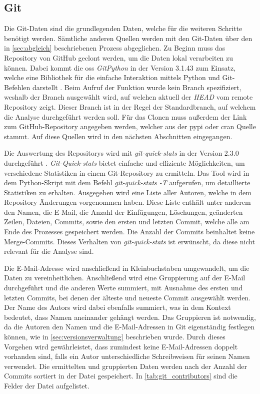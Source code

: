 \subsection{Git}
\label{subsec:datenbeschaffung_git}
Die Git-Daten sind die grundlegenden Daten, welche für die weiteren Schritte benötigt werden.
Sämtliche anderen Quellen werden mit den Git-Daten über den in \autoref{sec:abgleich} beschriebenen Prozess abgeglichen.
Zu Beginn muss das Repository von GitHub geclont werden, um die Daten lokal verarbeiten zu können.
Dabei kommt die \gls{oss} \emph{GitPython} in der Version 3.1.43 zum Einsatz, welche eine Bibliothek für die einfache Interaktion mittels Python und Git-Befehlen darstellt \autocite{thiel_gitpython-developersgitpython_2024}.
Beim Aufruf der Funktion wurde kein Branch spezifiziert, weshalb der Branch ausgewählt wird, auf welchen aktuell der \emph{HEAD} vom remote Repository zeigt.
Dieser Branch ist in der Regel der Standardbranch, auf welchem die Analyse durchgeführt werden soll.
Für das Clonen muss außerdem der Link zum GitHub-Repository angegeben werden, welcher aus der \gls{pypi} oder \gls{cran} Quelle stammt.
Auf diese Quellen wird in den nächsten Abschnitten eingegangen.

Die Auswertung des Repositorys wird mit \emph{git-quick-stats} in der Version 2.3.0 durchgeführt \autocite{arzzen_git-quick-statsgit-quick-stats_2021}.
\emph{Git-Quick-stats} bietet einfache und effiziente Möglichkeiten, um verschiedene Statistiken in einem Git-Repository zu ermitteln.
Das Tool wird in dem Python-Skript mit dem Befehl \emph{git-quick-stats -T} aufgerufen, um detaillierte Statistiken zu erhalten.
Ausgegeben wird eine Liste aller Autoren, welche in dem Repository Änderungen vorgenommen haben.
Diese Liste enthält unter anderem den Namen, die E-Mail, die Anzahl der Einfügungen, Löschungen, geänderten Zeilen, Dateien, Commits, sowie den ersten und letzten Commit, welche alle am Ende des Prozesses gespeichert werden.
Die Anzahl der Commits beinhaltet keine Merge-Commits.
Dieses Verhalten von \emph{git-quick-stats} ist erwünscht, da diese nicht relevant für die Analyse sind.

Die E-Mail-Adresse wird anschließend in Kleinbuchstaben umgewandelt, um die Daten zu vereinheitlichen.
Anschließend wird eine Gruppierung auf der E-Mail durchgeführt und die anderen Werte summiert, mit Ausnahme des ersten und letzten Commits, bei denen der älteste und neueste Commit ausgewählt werden.
Der Name des Autors wird dabei ebenfalls summiert, was in dem Kontext bedeutet, dass Namen aneinander gehängt werden.
Das Gruppieren ist notwendig, da die Autoren den Namen und die E-Mail-Adressen in Git eigenständig festlegen können, wie in \autoref{sec:versionsverwaltung} beschrieben wurde.
Durch dieses Vorgehen wird gewährleistet, dass zumindest keine E-Mail-Adressen doppelt vorhanden sind, falls ein Autor unterschiedliche Schreibweisen für seinen Namen verwendet.
Die ermittelten und gruppierten Daten werden nach der Anzahl der Commits sortiert in der Datei  gespeichert.
In \autoref{tab:git_contributors} sind die Felder der Datei aufgelistet.

